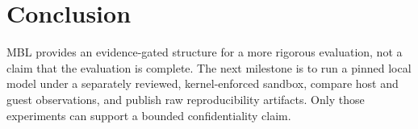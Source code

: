 \documentclass[10pt]{article}
\begin{document}
\section{Conclusion}
MBL provides an evidence-gated structure for a more rigorous evaluation, not a claim that the evaluation is complete. The next milestone is to run a pinned local model under a separately reviewed, kernel-enforced sandbox, compare host and guest observations, and publish raw reproducibility artifacts. Only those experiments can support a bounded confidentiality claim.
\end{document}

